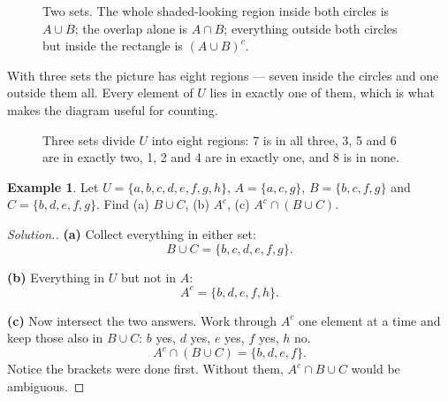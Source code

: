 \documentclass[11pt,a4paper]{article}
\theoremstyle{definition}
\newtheorem{example}[thm]{Example}
\newenvironment{solution}
  {\renewcommand{\qedsymbol}{}\begin{proof}[\textit{Solution}.]}
  {\end{proof}}
\begin{document}
\begin{figure}[H]
\centering
{}
\caption{Two sets. The whole shaded-looking region inside both circles is $A\cup B$; the overlap alone is $A\cap B$; everything outside both circles but inside the rectangle is $(A\cup B)^c$.}
\end{figure}

With three sets the picture has eight regions --- seven inside the circles and one
outside them all. Every element of $U$ lies in exactly one of them, which is what
makes the diagram useful for counting.

\begin{figure}[H]
\centering
{}
\caption{Three sets divide $U$ into eight regions: 7 is in all three, 3, 5 and 6 are in exactly two, 1, 2 and 4 are in exactly one, and 8 is in none.}
\end{figure}

\begin{example}
Let $U=\{a,b,c,d,e,f,g,h\}$, $A=\{a,c,g\}$, $B=\{b,c,f,g\}$ and $C=\{b,d,e,f,g\}$.
Find (a) $B\cup C$, (b) $A^c$, (c) $A^c\cap(B\cup C)$.
\end{example}

\begin{solution}
\textbf{(a)} Collect everything in either set:
$$B\cup C=\{b,c,d,e,f,g\}.$$

\textbf{(b)} Everything in $U$ but not in $A$:
$$A^c=\{b,d,e,f,h\}.$$

\textbf{(c)} Now intersect the two answers. Work through $A^c$ one element at a time
and keep those also in $B\cup C$: $b$ yes, $d$ yes, $e$ yes, $f$ yes, $h$ no.
$$A^c\cap(B\cup C)=\{b,d,e,f\}.$$
Notice the brackets were done first. Without them, $A^c\cap B\cup C$ would be
ambiguous.
\end{solution}
\end{document}
